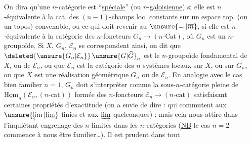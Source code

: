 On dira qu'une $n$-catégorie  est ``\uline{spéciale}'' (ou $n$-\uline{galoisienne}) si elle est $n$-équivalente à la cat. des $(n-1)$-champs loc. constants sur un espace top. (ou un topos) convenable, ou ce qui doit revenir au $\unsure{=|\overline m}$, si elle est $n$-équivalente à la catégorie des $n$-foncteurs $G_n\longrightarrow(n\text{-}\mathrm{Cat})$, où $G_n$ est un $n$-groupoïde, Si $X$, $G_n$, $\mathcal E_n$ se correspondent ainsi, on dit que $\deleted{\unsure{G_n|\mathcal E_n}}\,\unsure{G|\widehat G}_n$ est le $n$-groupoïde fondamental de $X$, ou de $\mathcal E_n$, ou que $\mathcal E_n$ est la catégorie des $n$-systèmes locaux sur $X$, ou sur $G_n$, ou que $X$ est une réalisation géométrique  $G_n$ ou de $\mathcal E_n$. En analogie avec le cas bien familier $n=1$, $G_n$ doit s'interpréter comme la sous-$n$-catégorie pleine de $\underline{\mathrm{Hom}}_n(\mathcal E_n,(n\text{-}\mathrm{cat}))$ formée des $n$-foncteurs $\mathcal E_n\to(n\text{-}\mathrm{cat})$ satisfaisant certaines propriétés d'exactitude (on a envie de dire : qui commutent aux $\unsure{\varprojlim|\underline{\lim}}$ finies et aux $\varinjlim$ quelconques) ; mais cela nous attire dans l'inquiétant engrenage des $n$-limites dans les $n$-catégories (\uline{NB} le cas $n=2$ commence à nous être familier\ldots). Il est prudent dans tout
